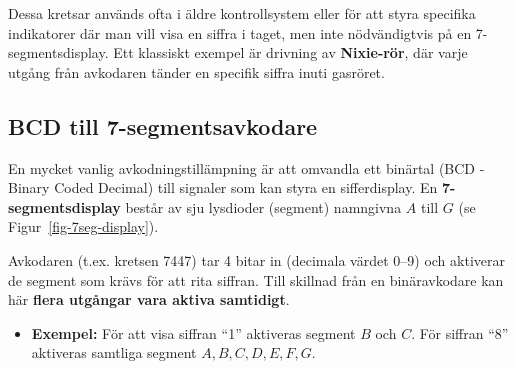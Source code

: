 \documentclass[
  swedish,
  letterpaper,
  oneside,
  openany]{book}
\providecommand{\tightlist}{%
  \setlength{\itemsep}{0pt}\setlength{\parskip}{0pt}}
\begin{document}
Dessa kretsar används ofta i äldre kontrollsystem eller för att styra
specifika indikatorer där man vill visa en siffra i taget, men inte
nödvändigtvis på en 7-segmentsdisplay. Ett klassiskt exempel är drivning
av \textbf{Nixie-rör}, där varje utgång från avkodaren tänder en
specifik siffra inuti gasröret.

\subsection{BCD till
7-segmentsavkodare}\label{sec-BCD-till-7seg-avkodare}

En mycket vanlig avkodningstillämpning är att omvandla ett binärtal (BCD
- Binary Coded Decimal) till signaler som kan styra en sifferdisplay. En
\textbf{7-segmentsdisplay} består av sju lysdioder (segment) namngivna
\(A\) till \(G\) (se Figur~\ref{fig-7seg-display}).

Avkodaren (t.ex. kretsen 7447) tar 4 bitar in (decimala värdet 0--9) och
aktiverar de segment som krävs för att rita siffran. Till skillnad från
en binäravkodare kan här \textbf{flera utgångar vara aktiva samtidigt}.

\begin{itemize}
\tightlist
\item
  \textbf{Exempel:} För att visa siffran ``1'' aktiveras segment \(B\)
  och \(C\). För siffran ``8'' aktiveras samtliga segment
  \(A, B, C, D, E, F, G\).
\end{itemize}
\end{document}
